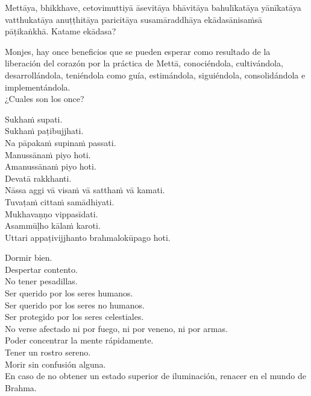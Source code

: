 \begin{leader}
\end{leader}

Mettāya, bhikkhave, cetovimuttiyā āsevitāya bhāvitāya bahulīkatāya yānīkatāya vatthukatāya anuṭṭhitāya paricitāya susamāraddhāya ekādasānisaṁsā pāṭikaṅkhā. Katame ekādasa?

\begin{english}
  Monjes, hay once beneficios que se pueden esperar como resultado de la liberación del corazón por la práctica de Mettā, conociéndola, cultivándola, desarrollándola, teniéndola como guía, estimándola, siguiéndola, consolidándola e implementándola.\\
  ¿Cuales son los once?
\end{english}

Sukhaṁ supati.\\
Sukhaṁ paṭibujjhati.\\
Na pāpakaṁ supinaṁ passati.\\
Manussānaṁ piyo hoti.\\
Amanussānaṁ piyo hoti.\\
Devatā rakkhanti.\\
Nāssa aggi vā visaṁ vā satthaṁ vā kamati.\\
Tuvaṭaṁ cittaṁ samādhiyati.\\
Mukhavaṇṇo vippasīdati.\\
Asammūḷho kālaṁ karoti.\\
Uttari appaṭivijjhanto brahmalokūpago hoti.

\clearpage

\begin{english}
  Dormir bien.\\
  Despertar contento.\\
  No tener pesadillas.\\
  Ser querido por los seres humanos.\\
  Ser querido por los seres no humanos.\\
  Ser protegido por los seres celestiales.\\
  No verse afectado ni por fuego, ni por veneno, ni por armas.\\
  Poder concentrar la mente rápidamente.\\
  Tener un rostro sereno.\\
  Morir sin confusión alguna.\\
  En caso de no obtener un estado superior de iluminación, renacer en el mundo de Brahma.
\end{english}

